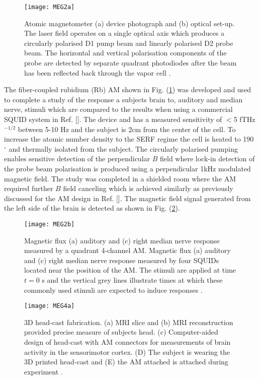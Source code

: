 \begin{figure}[b]
\centering
\texttt{[image: MEG2a]}
\caption{\label{fig:MEG2a} Atomic magnetometer (a) device photograph and (b) optical set-up. The laser field operates on a single optical axis which produces a circularly polarised D1 pump beam and linearly polarised D2 probe beam. The horizontal and vertical polarisation components of the probe are detected by separate quadrant photodiodes after the beam has been reflected back through the vapor cell \citep{Johnson2010MagnetoencephalographyMagnetometer}.}
\end{figure}

The fiber-coupled rubidium (Rb) AM shown in Fig. (\ref{fig:MEG2a}) was developed and used to complete a study of the response a subjects brain to, auditory and median nerve, stimuli which are compared to the results when using a commercial SQUID system in Ref. []. The device and has a measured sensitivity of $<$5 fTHz$^{-1/2}$ between 5-10 Hz and the subject is 2cm from the center of the cell. To increase the atomic number density to the SERF regime the cell is heated to 190 $^{\circ}$ and thermally isolated from the subject. The circularly polarised pumping enables sensitive detection of the perpendicular $B$ field where lock-in detection of the probe beam polarisation is produced using a perpendicular 1kHz modulated magnetic field. The study was completed in a shielded room where the AM required further $B$ field canceling which is achieved similarly as previously discussed for the AM design in Ref. []. The magnetic field signal generated from the left side of the brain is detected as shown in Fig. (\ref{fig:MEG2b}).  

\begin{figure}[b]
\centering
\texttt{[image: MEG2b]}
\caption{\label{fig:MEG2b} Magnetic flux (a) auditory and (c) right median nerve response measured by a quadrant 4-channel AM. Magnetic flux (a) auditory and (c) right median nerve response measured by four SQUIDs located near the position of the AM. The stimuli are applied at time $t=0$ s and the vertical grey lines illustrate times at which these commonly used stimuli are expected to induce responses \citep{Johnson2010MagnetoencephalographyMagnetometer}.}
\end{figure}

\begin{figure}[t]
\centering
\texttt{[image: MEG4a]}
\caption{\label{fig:MEG4a} 3D head-cast fabrication. (a) MRI slice and (b) MRI reconstruction provided precise measure of subjects head. (c) Computer-aided design of head-cast with AM connectors for measurements of brain activity in the sensorimotor cortex. (D) The subject is wearing the 3D printed head-cast and (E) the AM attached is attached during experiment \citep{Boto2017AMagnetometers}.}
\end{figure}



